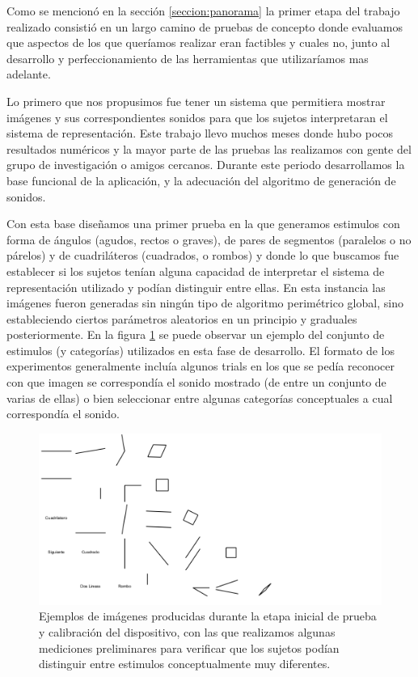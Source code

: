 \documentclass{article}
\begin{document}
    Como se mencionó en la sección \ref{seccion:panorama} la primer etapa del trabajo realizado consistió en un largo camino de pruebas de concepto donde evaluamos que aspectos de los que queríamos realizar eran factibles y cuales no, junto al desarrollo y perfeccionamiento de las herramientas que utilizaríamos mas adelante. 
    
    Lo primero que nos propusimos fue tener un sistema que permitiera mostrar imágenes y sus correspondientes sonidos para que los sujetos interpretaran el sistema de representación. Este trabajo llevo muchos meses donde hubo pocos resultados numéricos y la mayor parte de las pruebas las realizamos con gente del grupo de investigación o amigos cercanos. Durante este periodo desarrollamos la base funcional de la aplicación, y la adecuación del algoritmo de generación de sonidos. 
    
    Con esta base diseñamos una primer prueba en la que generamos estimulos con forma de ángulos (agudos, rectos o graves), de pares de segmentos (paralelos o no párelos) y de cuadriláteros (cuadrados, o rombos) y donde lo que buscamos fue establecer si los sujetos tenían alguna capacidad de interpretar el sistema de representación utilizado y podían distinguir entre ellas. En esta instancia las imágenes fueron generadas sin ningún tipo de algoritmo perimétrico global, sino estableciendo ciertos parámetros aleatorios en un principio y graduales posteriormente. En la figura \ref{fig:ImagenesDesarrollo1} se puede observar un ejemplo del conjunto de estimulos (y categorías) utilizados en esta fase de desarrollo. El formato de los experimentos generalmente incluía algunos trials en los que se pedía reconocer con que imagen se correspondía el sonido mostrado (de entre un conjunto de varias de ellas) o bien seleccionar entre algunas categorías conceptuales a cual correspondía el sonido. 
    
    \begin{figure}
        \center
        \includegraphics[width=\textwidth]{Imagenes/ImagenesDesarrollo1.png}
        \caption{Ejemplos de imágenes producidas durante la etapa inicial de prueba y calibración del dispositivo, con las que realizamos algunas mediciones preliminares para verificar que los sujetos podían distinguir entre estimulos conceptualmente muy diferentes.}
        \label{fig:ImagenesDesarrollo1}
    \end{figure}  
    
\end{document}
